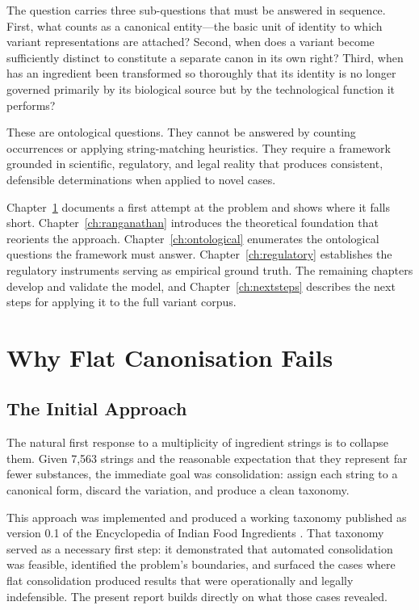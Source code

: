 \documentclass[12pt,a3paper]{article}
\begin{document}
The question carries three sub-questions that must be answered in sequence. First, what counts as a canonical entity---the basic unit of identity to which variant representations are attached? Second, when does a variant become sufficiently distinct to constitute a separate canon in its own right? Third, when has an ingredient been transformed so thoroughly that its identity is no longer governed primarily by its biological source but by the technological function it performs?

These are ontological questions. They cannot be answered by counting occurrences or applying string-matching heuristics. They require a framework grounded in scientific, regulatory, and legal reality that produces consistent, defensible determinations when applied to novel cases.

Chapter~\ref{ch:flatfail} documents a first attempt at the problem and shows where it falls short. Chapter~\ref{ch:ranganathan} introduces the theoretical foundation that reorients the approach. Chapter~\ref{ch:ontological} enumerates the ontological questions the framework must answer. Chapter~\ref{ch:regulatory} establishes the regulatory instruments serving as empirical ground truth. The remaining chapters develop and validate the model, and Chapter~\ref{ch:nextsteps} describes the next steps for applying it to the full variant corpus.

\newpage


\section{Why Flat Canonisation Fails}
\label{ch:flatfail}

\subsection{The Initial Approach}

The natural first response to a multiplicity of ingredient strings is to collapse them. Given 7,563 strings and the reasonable expectation that they represent far fewer substances, the immediate goal was consolidation: assign each string to a canonical form, discard the variation, and produce a clean taxonomy.

This approach was implemented and produced a working taxonomy published as version 0.1 of the Encyclopedia of Indian Food Ingredients \cite{EncyclopediaV01}. That taxonomy served as a necessary first step: it demonstrated that automated consolidation was feasible, identified the problem's boundaries, and surfaced the cases where flat consolidation produced results that were operationally and legally indefensible. The present report builds directly on what those cases revealed.
\end{document}
